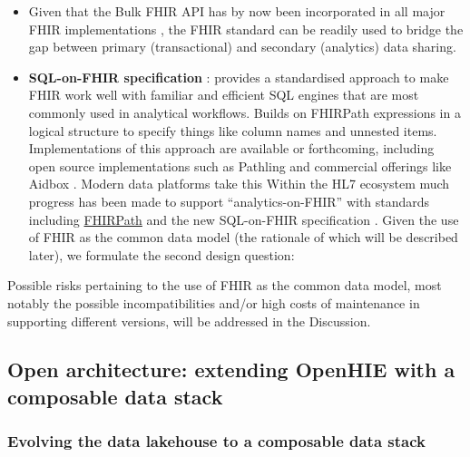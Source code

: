 \documentclass[
  authoryear]{elsarticle}
\providecommand{\tightlist}{%
  \setlength{\itemsep}{0pt}\setlength{\parskip}{0pt}}\usepackage{longtable,booktabs,array}
\begin{document}
\begin{itemize}
\tightlist
\item
  Given that the Bulk FHIR API has by now been incorporated in all major
  FHIR implementations \citep{mandl2020push, jones2021landscape}, the
  FHIR standard can be readily used to bridge the gap between primary
  (transactional) and secondary (analytics) data sharing.
\item
  \textbf{SQL-on-FHIR specification} \citep{sql-on-fhir}: provides a
  standardised approach to make FHIR work well with familiar and
  efficient SQL engines that are most commonly used in analytical
  workflows. Builds on FHIRPath \citep{hl72020fhirpath} expressions in a
  logical structure to specify things like column names and unnested
  items. Implementations of this approach are available or forthcoming,
  including open source implementations such as Pathling
  \citep{grimes2022pathling} and commercial offerings like Aidbox
  \citep{aidbox}. Modern data platforms take this Within the HL7
  ecosystem much progress has been made to support ``analytics-on-FHIR''
  with standards including \href{https://hl7.org/fhirpath/}{FHIRPath}
  and the new SQL-on-FHIR specification \citep{sql-on-fhir}. Given the
  use of FHIR as the common data model (the rationale of which will be
  described later), we formulate the second design question:
\end{itemize}

Possible risks pertaining to the use of FHIR as the common data model,
most notably the possible incompatibilities and/or high costs of
maintenance in supporting different versions, will be addressed in the
Discussion.

\subsection{Open architecture: extending OpenHIE with a composable data
stack}\label{open-architecture-extending-openhie-with-a-composable-data-stack}

\subsubsection{Evolving the data lakehouse to a composable data
stack}\label{evolving-the-data-lakehouse-to-a-composable-data-stack}
\end{document}
